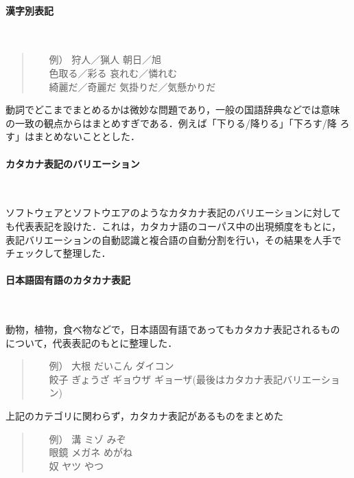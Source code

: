 \documentclass[a4j,titlepage]{jarticle}
\begin{document}
\paragraph{漢字別表記} \ 

       \begin{quote}
	\begin{itemize}
	 \item[例）] 狩人／猟人 朝日／旭 \\
		   色取る／彩る 哀れむ／憐れむ \\
		   綺麗だ／奇麗だ 気掛りだ／気懸かりだ 
	\end{itemize}
       \end{quote}

動詞でどこまでまとめるかは微妙な問題であり，一般の国語辞典などでは意味
の一致の観点からはまとめすぎである．例えば「下りる/降りる」「下ろす/降
ろす」はまとめないこととした．


\paragraph{カタカナ表記のバリエーション} \ 

ソフトウェアとソフトウエアのようなカタカナ表記のバリエーションに対して
も代表表記を設けた．これは，カタカナ語のコーパス中の出現頻度をもとに，
表記バリエーションの自動認識と複合語の自動分割を行い，その結果を人手で
チェックして整理した．


\paragraph{日本語固有語のカタカナ表記} \ 

動物，植物，食べ物などで，日本語固有語であってもカタカナ表記されるもの
について，代表表記のもとに整理した．
       \begin{quote}
	\begin{itemize}
	 \item[例）] 大根 だいこん ダイコン \\
		   餃子 ぎょうざ ギョウザ ギョーザ(最後はカタカナ表記バリエーション)
	\end{itemize}
       \end{quote}

上記のカテゴリに関わらず，カタカナ表記があるものをまとめた
       \begin{quote}
	\begin{itemize}
	 \item[例）] 溝 ミゾ みぞ \\
		   眼鏡 メガネ めがね \\
		   奴 ヤツ やつ
	\end{itemize}
       \end{quote}
\end{document}
